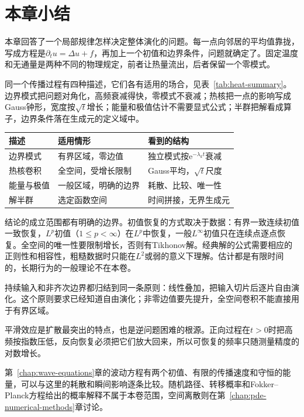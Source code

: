 \section{本章小结}
\label{sec:heat-summary}

本章回答了一个局部规律怎样决定整体演化的问题。每一点向邻居的平均值靠拢，写成方程是$\partial_tu=\Delta u+f$，再加上一个初值和边界条件，问题就确定了。固定温度和无通量是两种不同的物理规定，前者让热量流出，后者保留一个零模式。

同一个传播过程有四种描述，它们各有适用的场合，见表~\ref{tab:heat-summary}。边界模式把问题对角化，高频衰减得快，零模式不衰减；热核把一点的影响写成Gauss钟形，宽度按$\sqrt{t}$增长；能量和极值估计不需要显式公式；半群把解看成算子，边界条件落在生成元的定义域中。

\begin{BookInlineTable}
  \centering
  \caption{同一扩散过程的四种描述。}
  \label{tab:heat-summary}
  \begin{tabular}{lll}
    \toprule
    描述 & 适用情形 & 看到的结构\\
    \midrule
    边界模式 & 有界区域，零边值 & 独立模式按$\mathrm{e}^{-\lambda_kt}$衰减\\
    热核卷积 & 全空间，受增长限制 & Gauss平均，$\sqrt{t}$尺度\\
    能量与极值 & 一般区域，明确的边界 & 耗散、比较、唯一性\\
    解半群 & 选定函数空间 & 时间拼接，无界生成元\\
    \bottomrule
  \end{tabular}
\end{BookInlineTable}

结论的成立范围都有明确的边界。初值恢复的方式取决于数据：有界一致连续初值一致恢复，$L^p$初值（$1\leq p<\infty$）在$L^p$中恢复，一般$L^\infty$初值只在连续点逐点恢复。全空间的唯一性要限制增长，否则有Tikhonov解。经典解的公式需要相应的正则性和相容性，粗糙数据时只能在$L^2$或弱的意义下理解。估计都是有限时间的，长期行为的一般理论不在本卷。

持续输入和非齐次边界都归结到同一条原则：线性叠加，把输入切片后逐片自由演化。这个原则要求已经知道自由演化；非零边值要先提升，全空间卷积不能直接用于有界区域。

平滑效应是扩散最突出的特点，也是逆问题困难的根源。正向过程在$t>0$时把高频按指数压低，反向恢复必须把它们放大回来，所以可恢复的频率只随测量精度的对数增长。

第~\ref{chap:wave-equations}章的波动方程有两个初值、有限的传播速度和守恒的能量，可以与这里的耗散和瞬间影响逐条比较。随机路径、转移概率和Fokker--Planck方程给出的概率解释不属于本卷范围，空间离散则在第~\ref{chap:pde-numerical-methods}章讨论。
